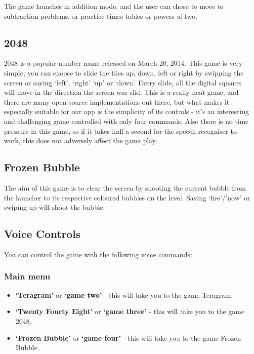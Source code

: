 \documentclass[11pt, oneside]{article}
\begin{document}
The game launches in addition mode, and the user can chose to move to
subtraction problems, or practice times tables or powers of two.

\subsection{2048}

2048 is a popular number name released on March 20, 2014. This game is
very simple; you can choose to slide the tiles up, down, left or right
by swipping the screen or saying `left', `right' `up' or `down'. Every
slide, all the digital squares will move in the direction the screen was slid. 
This is a really neat game, and there are many open source
implementations out there, but what makes it especially suitable for
our app is the simplicity of its controls - it's an interesting and
challenging game controlled with only four commands. Also there is no
time pressure in this game, so if it takes half a second for the
speech recogniser to work, this does not adversely affect the game
play.

\subsection{Frozen Bubble}
The aim of this game is to clear the screen by shooting the current
bubble from the launcher to its respective coloured bubbles on the
level. Saying `fire'/'now' or swiping up will shoot the bubble.

\subsection{Voice Controls}

You can control the game with the following voice commands:

\subsubsection{Main menu}

\begin{itemize}
  \item {\bf`Teragram'} or {\bf`game two'}  - this will take you to the game Teragram.
  \item {\bf`Twenty Fourty Eight'} or {\bf`game three'} - this will take you to the game 2048.
  \item {\bf`Frozen Bubble'} or {\bf`game four'} - this will take you to the game Frozen Bubble.
\end{itemize}
\end{document}
